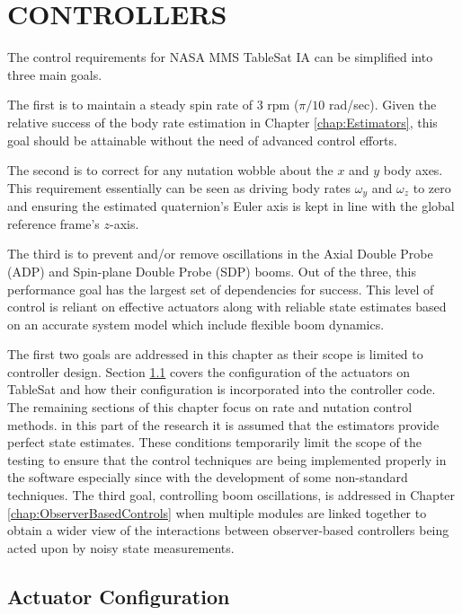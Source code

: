 
\chapter{CONTROLLERS}
\label{chap:Controllers}

The control requirements for NASA MMS TableSat IA can be simplified into three main goals.

The first is to maintain a steady spin rate of 3 rpm ($\pi/10$ rad/sec).  Given the relative success of the body rate estimation in Chapter \ref{chap:Estimators}, this goal should be attainable without the need of advanced control efforts.

The second is to correct for any nutation wobble about the $x$ and $y$ body axes.  This requirement essentially can be seen as driving body rates $\omega_y$ and $\omega_z$ to zero and ensuring the estimated quaternion's Euler axis is kept in line with the global reference frame's $z$-axis.

The third is to prevent and/or remove oscillations in the Axial Double Probe (ADP) and Spin-plane Double Probe (SDP) booms.  Out of the three, this performance goal has the largest set of dependencies for success.  This level of control is reliant on effective actuators along with reliable state estimates based on an accurate system model which include flexible boom dynamics.

The first two goals are addressed in this chapter as their scope is limited to controller design.  Section \ref{sec:ActuatorConfiguration} covers the configuration of the actuators on TableSat and how their configuration is incorporated into the controller code.  The remaining sections of this chapter focus on rate and nutation control methods.  in this part of the research it is assumed that the estimators provide perfect state estimates.  These conditions temporarily limit the scope of the testing to ensure that the control techniques are being implemented properly in the software especially since with the development of some non-standard techniques.  The third goal, controlling boom oscillations, is addressed in Chapter \ref{chap:ObserverBasedControls} when multiple modules are linked together to obtain a wider view of the interactions between observer-based controllers being acted upon by noisy state measurements.

\section{Actuator Configuration}
\label{sec:ActuatorConfiguration}

